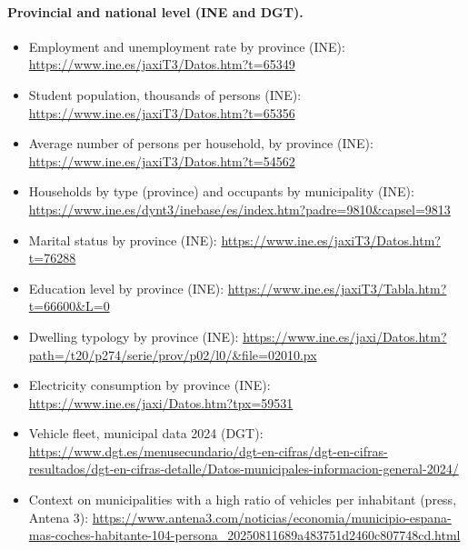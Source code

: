 \paragraph{Provincial and national level (INE and DGT).}
\begin{itemize}
  \item Employment and unemployment rate by province (INE): \url{https://www.ine.es/jaxiT3/Datos.htm?t=65349}
  \item Student population, thousands of persons (INE): \url{https://www.ine.es/jaxiT3/Datos.htm?t=65356}
  \item Average number of persons per household, by province (INE): \url{https://www.ine.es/jaxiT3/Datos.htm?t=54562}
  \item Households by type (province) and occupants by municipality (INE): \url{https://www.ine.es/dynt3/inebase/es/index.htm?padre=9810&capsel=9813}
  \item Marital status by province (INE): \url{https://www.ine.es/jaxiT3/Datos.htm?t=76288}
  \item Education level by province (INE): \url{https://www.ine.es/jaxiT3/Tabla.htm?t=66600&L=0}
  \item Dwelling typology by province (INE): \url{https://www.ine.es/jaxi/Datos.htm?path=/t20/p274/serie/prov/p02/l0/&file=02010.px}
  \item Electricity consumption by province (INE): \url{https://www.ine.es/jaxi/Datos.htm?tpx=59531}
  \item Vehicle fleet, municipal data 2024 (DGT): \url{https://www.dgt.es/menusecundario/dgt-en-cifras/dgt-en-cifras-resultados/dgt-en-cifras-detalle/Datos-municipales-informacion-general-2024/}
  \item Context on municipalities with a high ratio of vehicles per inhabitant (press, Antena 3): \url{https://www.antena3.com/noticias/economia/municipio-espana-mas-coches-habitante-104-persona_20250811689a483751d2460c807748cd.html}
\end{itemize}

